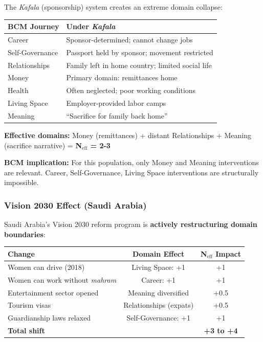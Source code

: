 \begin{tcolorbox}[colback=red!5!white, colframe=red!75!black, title=Special Case: Migrant Workers Under \textit{Kafala}]

The \textit{Kafala} (sponsorship) system creates an extreme domain collapse:

\begin{center}
\begin{tabular}{@{}lp{7cm}@{}}
\toprule
\textbf{BCM Journey} & \textbf{Under \textit{Kafala}} \\
\midrule
Career & Sponsor-determined; cannot change jobs \\
Self-Governance & Passport held by sponsor; movement restricted \\
Relationships & Family left in home country; limited social life \\
Money & Primary domain: remittances home \\
Health & Often neglected; poor working conditions \\
Living Space & Employer-provided labor camps \\
Meaning & ``Sacrifice for family back home'' \\
\bottomrule
\end{tabular}
\end{center}

\textbf{Effective domains:} Money (remittances) + distant Relationships + Meaning (sacrifice narrative) = \textbf{N$_{\text{eff}}$ = 2-3}

\textbf{BCM implication:} For this population, only Money and Meaning interventions are relevant. Career, Self-Governance, Living Space interventions are structurally impossible.

\end{tcolorbox}

\subsubsection{Vision 2030 Effect (Saudi Arabia)}

Saudi Arabia's Vision 2030 reform program is \textbf{actively restructuring domain boundaries}:

\begin{center}
\begin{tabular}{@{}lcc@{}}
\toprule
\textbf{Change} & \textbf{Domain Effect} & \textbf{N$_{\text{eff}}$ Impact} \\
\midrule
Women can drive (2018) & Living Space: +1 & +1 \\
Women can work without \textit{mahram} & Career: +1 & +1 \\
Entertainment sector opened & Meaning diversified & +0.5 \\
Tourism visas & Relationships (expats) & +0.5 \\
Guardianship laws relaxed & Self-Governance: +1 & +1 \\
\midrule
\textbf{Total shift} & & \textbf{+3 to +4} \\
\bottomrule
\end{tabular}
\end{center}

